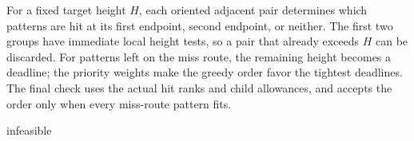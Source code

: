 For a fixed target height $H$, each oriented adjacent pair determines
which patterns are hit at its first endpoint, second endpoint, or
neither. The first two groups have immediate local height tests, so a
pair that already exceeds $H$ can be discarded. For patterns left on
the miss route, the remaining height becomes a deadline; the priority
weights make the greedy order favor the tightest deadlines. The final
check uses the actual hit ranks and child allowances, and accepts the
order only when every miss-route pattern fits.

\begin{algorithm}[H]
\caption{\PriorityTrial: internal fallback for one height trial}
\label{alg:priority-trial}
\KwRet infeasible\;
\end{algorithm}
